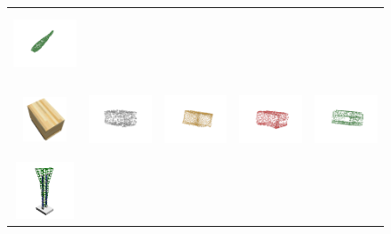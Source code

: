 \documentclass[bachelor, nocolorlinks, printoneside]{seuthesis} %
\begin{document}
\begin{Appendix}{}
\begin{figure}[!h]
\begin{tabular}{c@{}c@{}c@{}c@{}c@{}}
            \includegraphics[width=0.18\columnwidth,height=2cm]{figs/supp_real_dataset/oracle/rocket_99314b704285c0ca16e3314677399d49_oracle.png} \\
            \vspace{-5mm}
            \includegraphics[width=0.11\columnwidth,height=1.3cm]{figs/supp_real_dataset/Image/table_3942f02501161134c3bd24f986301745.png} &
            \includegraphics[width=0.18\columnwidth,height=2cm]{figs/supp_real_dataset/GT/table_3942f02501161134c3bd24f986301745_gt.png} &
            \includegraphics[width=0.18\columnwidth,height=2cm]{figs/supp_real_dataset/AE_label/table_3942f02501161134c3bd24f986301745_label.png} &
            \includegraphics[width=0.18\columnwidth,height=2cm]{figs/supp_real_dataset/AE/table_3942f02501161134c3bd24f986301745_pred.png} &
            \includegraphics[width=0.18\columnwidth,height=2cm]{figs/supp_real_dataset/oracle/table_3942f02501161134c3bd24f986301745_oracle.png} \\
            \vspace{-5mm}
            \includegraphics[width=0.11\columnwidth,height=1.7cm]{figs/supp_real_dataset/Image/tower_f584f1a14904b958ba9419f3b43eb3bd.png} &

\end{tabular}
\end{figure}
\end{Appendix}
\end{document}
